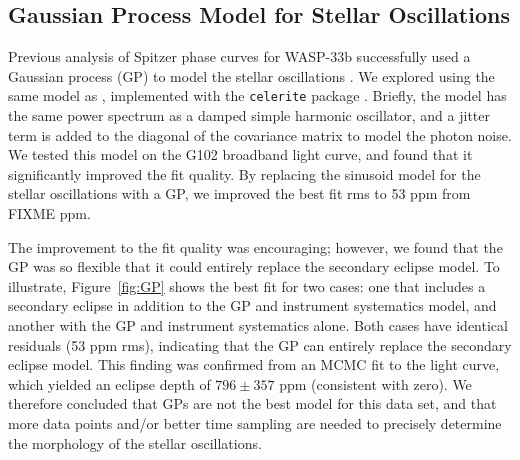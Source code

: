 \documentclass[twocolumn]{aastex62}
\begin{document}
\subsection{Gaussian Process Model for Stellar Oscillations}
Previous analysis of Spitzer phase curves for WASP-33b successfully used a Gaussian process (GP) to model the stellar oscillations \citep{zhang17}. We explored using the same model as \cite{zhang17}, implemented with the \texttt{celerite} package \citep{foremanmackey17}. Briefly, the model has the same power spectrum as a damped simple harmonic oscillator, and a jitter term is added to the diagonal of the covariance matrix to model the photon noise.  We tested this model on the G102 broadband light curve, and found that it significantly improved the fit quality. By replacing the sinusoid model for the stellar oscillations with a GP, we improved the best fit rms to 53 ppm from FIXME ppm.

The improvement to the fit quality was encouraging; however, we found that the GP was so flexible that it could entirely replace the secondary eclipse model. To illustrate, Figure~\ref{fig:GP} shows the best fit for two cases: one that includes a secondary eclipse in addition to the GP and instrument systematics model, and another with the GP and instrument systematics alone. Both cases have identical residuals (53 ppm rms), indicating that the GP can entirely replace the secondary eclipse model. This finding was confirmed from an MCMC fit to the light curve, which yielded an eclipse depth of $796 \pm 357$ ppm (consistent with zero).  We therefore concluded that GPs are not the best model for this data set, and that more data points and/or better time sampling are needed to precisely determine the morphology of the stellar oscillations.
\end{document}
